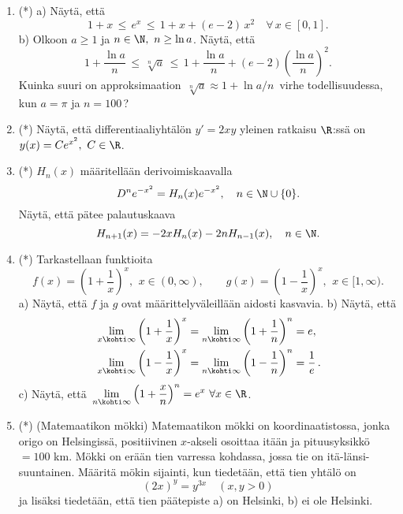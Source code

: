 \begin{enumerate}
\item (*)
a) Näytä, että
\[
1+x\,\le\,e^x\,\le\,1+x+(e-2)\,x^2 \quad \forall\,x\in[0,1].
\]
b) Olkoon $a \ge 1$ ja $n\in\N,\ n\ge\ln a$. Näytä, että
\[
1+\frac{\ln a}{n}\,\le\,\sqrt[n]{a}\,\le\,1+\frac{\ln a}{n}+(e-2)\left(\frac{\ln a}{n}\right)^2.
\]
Kuinka suuri on approksimaation $\,\sqrt[n]{a} \approx 1+\ln a/n\,$ virhe todellisuudessa, kun
$a=\pi$ ja $n=100\,$?

\item (*)
Näytä, että differentiaaliyhtälön $y'=2xy$ yleinen ratkaisu $\R$:ssä on
$y(x)=Ce^{x^2},\ C\in\R$.

\item (*) 
 $H_n(x)$ määritellään derivoimiskaavalla
\[
D^ne^{-x^2}=H_n(x)e^{-x^2}, \quad n\in\N\cup\{0\}.
\]
Näytä, että pätee palautuskaava
\[
H_{n+1}(x)=-2xH_n(x)-2nH_{n-1}(x), \quad n\in\N.
\]
 
\item (*) \label{H-exp-2: eksoottisia raja-arvoja}
Tarkastellaan funktioita
\[
f(x)=\left(1+\frac{1}{x}\right)^x,\,\ x\in(0,\infty), \qquad
g(x)=\left(1-\frac{1}{x}\right)^x,\,\ x\in[1,\infty).
\]
a) Näytä, että $f$ ja $g$ ovat määrittelyväleillään aidosti kasvavia. \newline
b) Näytä, että
\begin{align*}
&\lim_{x\kohti\infty}\left(1+\frac{1}{x}\right)^x
    =\lim_{n\kohti\infty}\left(1+\frac{1}{n}\right)^n=e, \\
&\lim_{x\kohti\infty}\left(1-\frac{1}{x}\right)^x
    =\lim_{n\kohti\infty}\left(1-\frac{1}{n}\right)^n=\frac{1}{e}\,.
\end{align*}
c) Näytä, että 
$\,\displaystyle{\lim_{n\kohti\infty}\left(1+\frac{x}{n}\right)^n=e^x\ \forall x\in\R}$.

\item (*) 
(Matemaatikon mökki) Matemaatikon mökki on koordinaatistossa, jonka origo on Helsingissä,
positiivinen $x$-akseli osoittaa itään ja pituusyksikkö $=100$ km. Mökki on erään tien
varressa kohdassa, jossa tie on itä-länsi-suuntainen. Määritä mökin sijainti, kun tiedetään,
että tien yhtälö on
\[
(2x)^y=y^{3x} \quad (x,y>0)
\]
ja lisäksi tiedetään, että tien päätepiste a) on Helsinki, b) ei ole Helsinki.


\end{enumerate}
